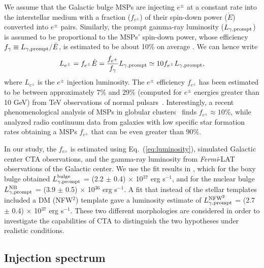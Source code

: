 \documentclass[doublespace,nopageskip]{VTthesis} %
\begin{document}
We assume that the Galactic bulge MSPs are injecting $e^{\pm}$ at a constant rate into the interstellar medium with a fraction ($f_{e^{\pm}}$) of their spin-down power ($\dot E$) converted into $e^{\pm}$ pairs. Similarly, the prompt gamma-ray luminosity ($L_{\gamma,{\rm prompt}}$) is assumed to be proportional to the MSPs' spin-down power, whose efficiency $f_\gamma \equiv L_{\gamma,{\rm prompt}}/\dot{E}$, is estimated to be about 10\% on average \citep{TheFermi-LAT:2013ssa}. We can hence write 
\begin{equation}\label{eq:luminosity}
  L_{e^\pm}=f_{e^\pm}\dot{E}=\frac{f_{e^\pm}}{f_{\gamma}}  L_{\gamma,{\rm prompt}} \simeq 10f_{e^\pm} L_{\gamma,{\rm prompt}},
\end{equation}
where $L_{e^\pm}$ is the $e^\pm$ injection luminosity. The $e^\pm$ efficiency $f_{e^\pm}$ has been estimated to be between approximately 7\% and 29\% (computed for $e^\pm$ energies greater than 10 GeV) from TeV observations of normal pulsars~\citep{Hooper:2017gtd}.
Interestingly, a recent phenomenological analysis of MSPs in globular clusters~\citep{Song:2021zrs} finds $f_{e^\pm}\approx 10\%$, while \citet{Sudoh:2020hyu} analyzed radio continuum data from galaxies with low specific star formation rates obtaining a MSPs $f_{e^\pm}$ that can be even greater than $90\%$.



In our study, the $f_{e^\pm}$ is estimated using Eq.~(\ref{eq:luminosity}), simulated Galactic center CTA observations, and the gamma-ray luminosity from \textit{Fermi}-LAT observations of the Galactic center. We use the fit results in \cite{Macias:2019omb}, which for the boxy bulge obtained $L^{\text{bulge}}_{\gamma,{\rm prompt}}$ = (2.2 $\pm$ 0.4) $\times$ 10$^{37}$ erg s$^{-1}$, and for the nuclear bulge $L^{\text{NB}}_{\gamma,{\rm prompt}}$ = (3.9 $\pm$ 0.5) $\times$ 10$^{36}$ erg s$^{-1}$. A fit that instead of the stellar templates included a DM (NFW$^2$) template gave a luminosity estimate of $L^{\text{NFW}^2}_{\gamma,{\rm prompt}}$ = (2.7 $\pm$ 0.4) $\times$ 10$^{37}$ erg s$^{-1}$. These two different morphologies are considered in order to investigate the capabilities of CTA to distinguish the two hypotheses under realistic conditions.

\subsection{Injection spectrum}\label{subsec:spectrum}
\end{document}
